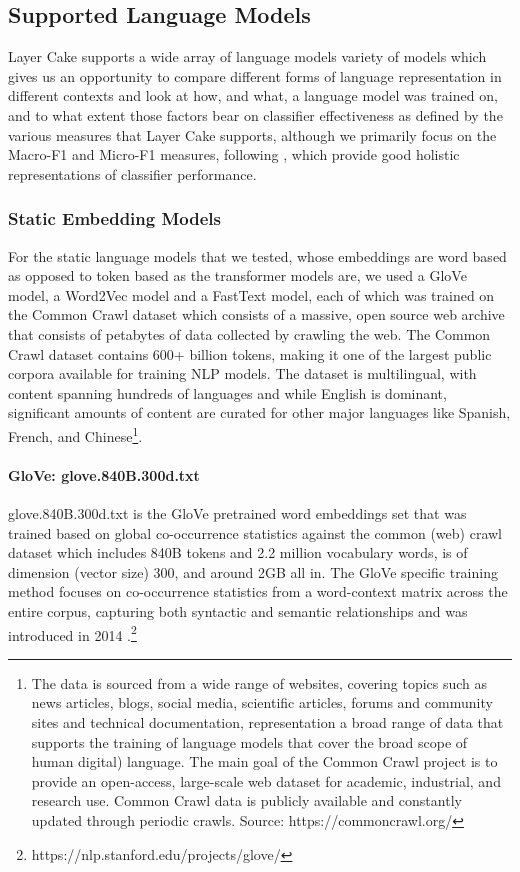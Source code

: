 \documentclass[final]{clv2025}
\begin{document}
\subsection{Supported Language Models}
Layer Cake supports a wide array of language models variety of models which gives us an opportunity to compare different forms of language representation in different contexts and look at how, and what, a language model was trained on, and to what extent those factors bear on classifier effectiveness as defined by the various measures that Layer Cake supports, although we primarily focus on the Macro-F1 and Micro-F1 measures, following \cite{moreo}, which provide good holistic representations of classifier performance.

\subsubsection{Static Embedding Models}
For the static language models that we tested, whose embeddings are word based as opposed to token based as the transformer models are, we used a GloVe model, a Word2Vec model and a FastText model, each of which was trained on the Common Crawl dataset which consists of a massive, open source web archive that consists of petabytes of data collected by crawling the web. The Common Crawl dataset contains 600+ billion tokens, making it one of the largest public corpora available for training NLP models. The dataset is multilingual, with content spanning hundreds of languages and while English is dominant, significant amounts of content are curated for other major languages like Spanish, French, and Chinese\footnote{The data is sourced from a wide range of websites, covering topics such as news articles, blogs, social media, scientific articles, forums and community sites and technical documentation, representation a broad range of data that supports the training of language models that cover the broad scope of human digital) language. The main goal of the Common Crawl project is to provide an open-access, large-scale web dataset for academic, industrial, and research use. Common Crawl data is publicly available and constantly updated through periodic crawls. Source: https://commoncrawl.org/}. 

\paragraph{GloVe: glove.840B.300d.txt} 

glove.840B.300d.txt is the GloVe pretrained word embeddings set that was trained based on global co-occurrence statistics against the common (web) crawl dataset which includes 840B tokens and 2.2 million vocabulary words, is of dimension (vector size) 300, and around 2GB all in. The GloVe specific training method focuses on co-occurrence statistics from a word-context matrix across the entire corpus, capturing both syntactic and semantic relationships and was introduced in 2014 \cite{pennington}.\footnote{  https://nlp.stanford.edu/projects/glove/} 
\end{document}
